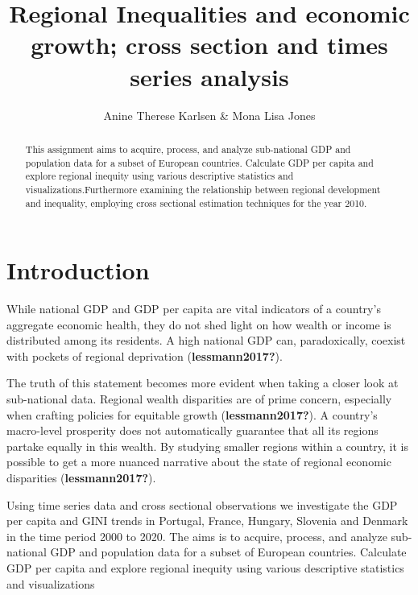 \documentclass[
  a4paper,
  DIV=11,
  numbers=noendperiod]{scrartcl}
\title{Regional Inequalities and economic growth; cross section and
times series analysis}
\author{Anine Therese Karlsen \& Mona Lisa Jones}
\date{}
\begin{document}
\maketitle
\begin{abstract}
This assignment aims to acquire, process, and analyze sub-national GDP
and population data for a subset of European countries. Calculate GDP
per capita and explore regional inequity using various descriptive
statistics and visualizations.Furthermore examining the relationship
between regional development and inequality, employing cross sectional
estimation techniques for the year 2010.
\end{abstract}
\ifdefined\Shaded\renewenvironment{Shaded}{\begin{tcolorbox}[boxrule=0pt, sharp corners, frame hidden, borderline west={3pt}{0pt}{shadecolor}, breakable, interior hidden, enhanced]}{\end{tcolorbox}}\fi

\hypertarget{introduction}{%
\section{Introduction}\label{introduction}}

While national GDP and GDP per capita are vital indicators of a
country's aggregate economic health, they do not shed light on how
wealth or income is distributed among its residents. A high national GDP
can, paradoxically, coexist with pockets of regional deprivation
(\textbf{lessmann2017?}).

The truth of this statement becomes more evident when taking a closer
look at sub-national data. Regional wealth disparities are of prime
concern, especially when crafting policies for equitable growth
(\textbf{lessmann2017?}). A country's macro-level prosperity does not
automatically guarantee that all its regions partake equally in this
wealth. By studying smaller regions within a country, it is possible to
get a more nuanced narrative about the state of regional economic
disparities (\textbf{lessmann2017?}).

Using time series data and cross sectional observations we investigate
the GDP per capita and GINI trends in Portugal, France, Hungary,
Slovenia and Denmark in the time period 2000 to 2020. The aims is to
acquire, process, and analyze sub-national GDP and population data for a
subset of European countries. Calculate GDP per capita and explore
regional inequity using various descriptive statistics and
visualizations
\end{document}
